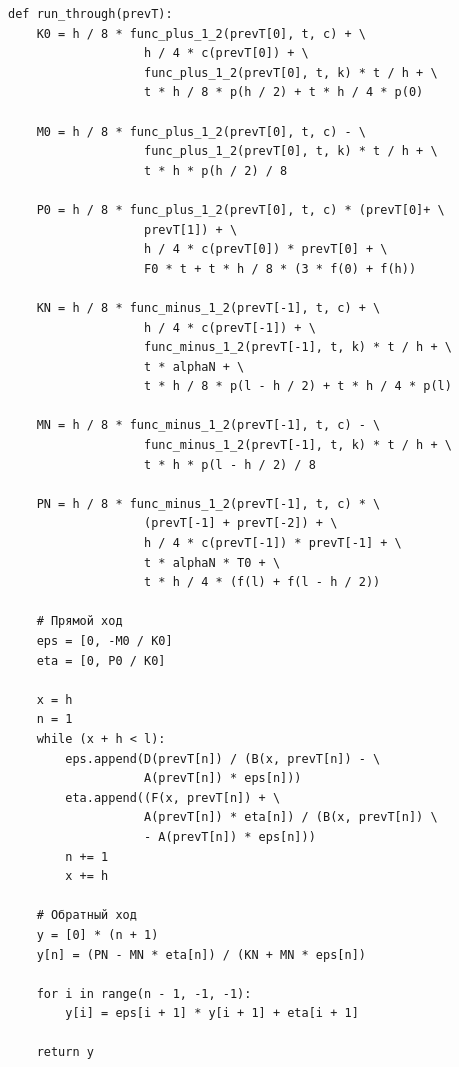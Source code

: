 \documentclass[a4paper,14pt]{extreport} %
\begin{document}
\begin{lstlisting}[caption=Метод прогонки]
def run_through(prevT):
    K0 = h / 8 * func_plus_1_2(prevT[0], t, c) + \
                   h / 4 * c(prevT[0]) + \
                   func_plus_1_2(prevT[0], t, k) * t / h + \
                   t * h / 8 * p(h / 2) + t * h / 4 * p(0)

    M0 = h / 8 * func_plus_1_2(prevT[0], t, c) - \
                   func_plus_1_2(prevT[0], t, k) * t / h + \
                   t * h * p(h / 2) / 8

    P0 = h / 8 * func_plus_1_2(prevT[0], t, c) * (prevT[0]+ \
                   prevT[1]) + \
                   h / 4 * c(prevT[0]) * prevT[0] + \
                   F0 * t + t * h / 8 * (3 * f(0) + f(h))

    KN = h / 8 * func_minus_1_2(prevT[-1], t, c) + \
                   h / 4 * c(prevT[-1]) + \
                   func_minus_1_2(prevT[-1], t, k) * t / h + \
                   t * alphaN + \
                   t * h / 8 * p(l - h / 2) + t * h / 4 * p(l)

    MN = h / 8 * func_minus_1_2(prevT[-1], t, c) - \
                   func_minus_1_2(prevT[-1], t, k) * t / h + \
                   t * h * p(l - h / 2) / 8

    PN = h / 8 * func_minus_1_2(prevT[-1], t, c) * \
                   (prevT[-1] + prevT[-2]) + \
                   h / 4 * c(prevT[-1]) * prevT[-1] + \
                   t * alphaN * T0 + \
                   t * h / 4 * (f(l) + f(l - h / 2))

    # Прямой ход
    eps = [0, -M0 / K0]
    eta = [0, P0 / K0]

    x = h
    n = 1
    while (x + h < l):
        eps.append(D(prevT[n]) / (B(x, prevT[n]) - \
                   A(prevT[n]) * eps[n]))
        eta.append((F(x, prevT[n]) + \
                   A(prevT[n]) * eta[n]) / (B(x, prevT[n]) \
                   - A(prevT[n]) * eps[n]))
        n += 1
        x += h

    # Обратный ход
    y = [0] * (n + 1)
    y[n] = (PN - MN * eta[n]) / (KN + MN * eps[n])

    for i in range(n - 1, -1, -1):
        y[i] = eps[i + 1] * y[i + 1] + eta[i + 1]

    return y
\end{lstlisting}
\end{document}

